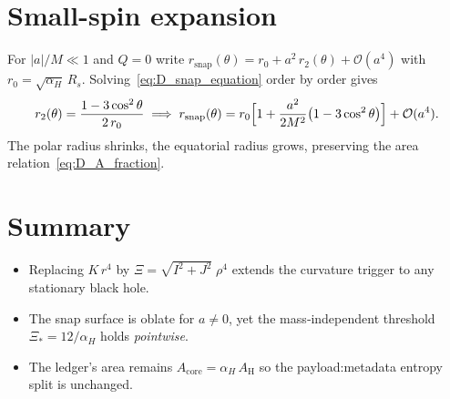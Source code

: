 \documentclass[a4paper, 12pt, oneside]{book}
\numberwithin{equation}{chapter}
\begin{document}
\section{Small-spin expansion}
For $|a|/M\ll1$ and $Q=0$ write
\(r_{\mathrm{snap}}(\theta)=r_{0}+a^{2}\,r_{2}(\theta)+\mathcal O(a^{4})\)
with \(r_{0}=\sqrt{\alpha_{H}}\,R_{s}\).
Solving~\eqref{eq:D_snap_equation} order by order gives
\[
r_{2}(\theta)
=\frac{1-3\cos^{2}\theta}{2\,r_{0}}\;
\Longrightarrow\;
r_{\mathrm{snap}}(\theta)
=r_{0}\Bigl[1+\frac{a^{2}}{2M^{2}}\bigl(1-3\cos^{2}\theta\bigr)\Bigr]
+\mathcal O(a^{4}).
\]
The polar radius shrinks, the equatorial radius grows, preserving the
area relation~\eqref{eq:D_A_fraction}.

\section{Summary}
\begin{itemize}
\item Replacing \(K\,r^{4}\) by
      \(\Xi=\sqrt{I^{2}+J^{2}}\;\rho^{4}\) extends the curvature trigger
      to any stationary black hole.
\item The snap surface is oblate for \(a\neq0\), yet the mass‐independent
      threshold \(\Xi_* = 12/\alpha_H\) holds \emph{pointwise}.
\item The ledger’s area remains
      \(A_{\mathrm{core}}=\alpha_{H}\,A_{\mathrm H}\)
      so the payload:metadata entropy split is unchanged.
\end{itemize}
\end{document}
